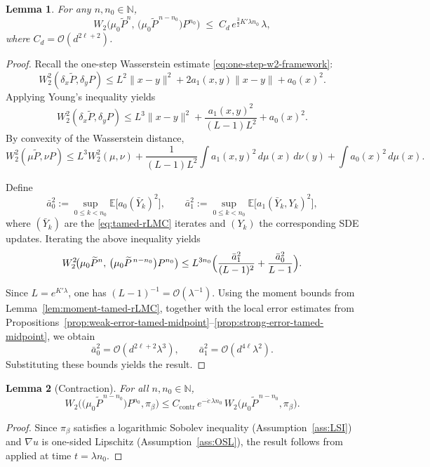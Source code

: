 \documentclass[11pt,a4paper,reqno]{amsart}
\theoremstyle{plain}
\newtheorem{lemma}{Lemma}
\theoremstyle{definition}
\theoremstyle{remark}
\newcommand{\E}{\mathbb{E}}
\begin{document}
\begin{lemma}\label{lem:uniform-wass}
For any \(n,n_0\in\mathbb{N}\),
\[
  W_2\!\bigl(\mu_0 \widetilde{P}^{n},\,\bigl(\mu_0 \widetilde P^{\,n-n_0}\bigr) P^{n_0}\bigr)
  \;\le\;
  C_d\, e^{\frac{3}{2}K'\lambda n_0}\,\lambda,
\]
where \(C_d = \mathcal{O}(d^{2\ell+2})\).
\end{lemma}

\begin{proof}
Recall the one-step Wasserstein estimate \eqref{eq:one-step-w2-framework}:
\[
  W_2^2(\delta_x \widetilde P,\delta_y P)
  \le
  L^2\|x-y\|^2
  +2a_1(x,y)\|x-y\|
  +a_0(x)^2.
\]
Applying Young’s inequality yields
\[
  W_2^2(\delta_x \widetilde P,\delta_y P)
  \le
  L^3\|x-y\|^2
  + \frac{a_1(x,y)^2}{(L-1)L^2}
  + a_0(x)^2.
\]
By convexity of the Wasserstein distance,
\[
  W_2^2(\mu \widetilde P,\nu P)
  \le
  L^3 W_2^2(\mu,\nu)
  + \frac{1}{(L-1)L^2}\int a_1(x,y)^2\,d\mu(x)\,d\nu(y)
  + \int a_0(x)^2\,d\mu(x).
\]

Define
\[
  \bar a_0^2 := \sup_{0\le k < n_0} \E\bigl[a_0(\bar Y_k)^2\bigr],
  \qquad
  \bar a_1^2 := \sup_{0\le k < n_0} \E\bigl[a_1(\bar Y_k,Y_k)^2\bigr],
\]
where $(\bar Y_k)$ are the \eqref{eq:tamed-rLMC} iterates and $(Y_k)$ the corresponding SDE updates.
Iterating the above inequality yields
\[
  W_2^2\!\bigl(\mu_0 \widetilde{P}^{n},\,\bigl(\mu_0 \widetilde P^{\,n-n_0}\bigr) P^{n_0}\bigr)
  \le
  L^{3n_0}
  \Bigl(
    \frac{\bar a_1^2}{(L-1)^2}
    +
    \frac{\bar a_0^2}{L-1}
  \Bigr).
\]

Since \(L=e^{K'\lambda}\), one has \((L-1)^{-1}=\mathcal{O}(\lambda^{-1})\).
Using the moment bounds from Lemma~\ref{lem:moment-tamed-rLMC}, together with the
local error estimates from Propositions~\ref{prop:weak-error-tamed-midpoint}--\ref{prop:strong-error-tamed-midpoint}, we obtain
\[
  \bar a_0^2 = \mathcal{O}(d^{2\ell+2}\lambda^3),
  \qquad
  \bar a_1^2 = \mathcal{O}(d^{4\ell}\lambda^2).
\]
Substituting these bounds yields the result.
\end{proof}

\begin{lemma}[Contraction]\label{lem:contr}
For all \(n,n_0\in\mathbb{N}\),
\[
  W_2\!\bigl(\bigl(\mu_0 \widetilde P^{\,n-n_0}\bigr) P^{n_0},\pi_\beta\bigr)
  \le
  C_{\mathrm{contr}}\, e^{-\dot c\,\lambda n_0}\,
  W_2\!\bigl(\mu_0 \widetilde P^{\,n-n_0},\pi_\beta\bigr).
\]
\end{lemma}

\begin{proof}
Since \(\pi_\beta\) satisfies a logarithmic Sobolev inequality (Assumption~\ref{ass:LSI}) and
\(\nabla u\) is one-sided Lipschitz (Assumption~\ref{ass:OSL}), the result follows from
\cite[Proposition 2.5]{yang2025non} applied at time \(t=\lambda n_0\).
\end{proof}
\end{document}
